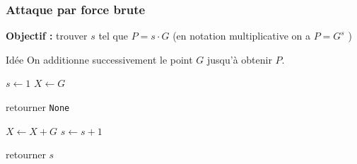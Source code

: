 \documentclass[
	11pt, %
]{beamer}
\begin{document}
\begin{frame}
	\frametitle{Attaque par force brute}
	\textbf{Objectif :} trouver $s$ tel que $P = s \cdot G$ (en notation multiplicative on a $P = G^s$ )


	\begin{block}{Idée}
	On additionne successivement le point $G$
	jusqu'à obtenir $P$.
	\end{block}


	\begin{algorithmic}[1]
	\State $s \gets 1$
	\State $X \gets G$



	     
	        \State retourner \texttt{None}
	    \EndIf


	    \State $X \gets X + G$
	    \State $s \gets s + 1$


	\EndWhile


	\State retourner $s$
	\end{algorithmic}
\end{frame}
\end{document}
